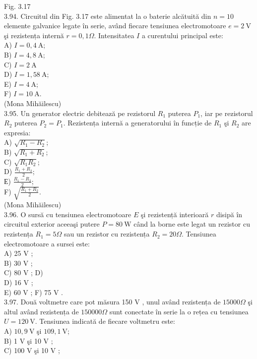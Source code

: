 \documentclass[10pt]{article}
\begin{document}
Fig. 3.17\\
3.94. Circuitul din Fig. 3.17 este alimentat la o baterie alcătuită din $n=10$ elemente galvanice legate în serie, având fiecare tensiunea electromotoare $e=2 \mathrm{~V}$ şi rezistența internă $r=0,1 \Omega$. Intensitatea $I$ a curentului principal este:\\
A) $I=0,4 \mathrm{~A}$;\\
B) $I=4,8 \mathrm{~A}$;\\
C) $I=2 \mathrm{~A}$\\
D) $I=1,58 \mathrm{~A}$;\\
E) $I=4 \mathrm{~A}$;\\
F) $I=10 \mathrm{~A}$.\\
(Mona Mihăilescu)\\
3.95. Un generator electric debitează pe rezistorul $R_{1}$ puterea $P_{1}$, iar pe rezistorul $R_{2}$ puterea $P_{2}=P_{1}$. Rezistența internă a generatorului în funcție de $R_{1}$ şi $R_{2}$ are expresia:\\
A) $\sqrt{R_{1}-R_{2}}$;\\
B) $\sqrt{R_{1}+R_{2}}$;\\
C) $\sqrt{R_{1} R_{2}}$;\\
D) $\frac{R_{1}+R_{2}}{2}$;\\
Е) $\frac{R_{1}-R_{2}}{2}$;\\
F) $\sqrt{\frac{R_{1}+R_{2}}{2}}$.\\
(Mona Mihăilescu)\\
3.96. O sursă cu tensiunea electromotoare $E$ şi rezistență interioară $r$ disipă în circuitul exterior aceeaşi putere $P=80 \mathrm{~W}$ când la borne este legat un rezistor cu rezistența $R_{1}=5 \Omega$ sau un rezistor cu rezistența $R_{2}=20 \Omega$. Tensiunea electromotoare a sursei este:\\
A) 25 V ;\\
B) 30 V ;\\
C) 80 V ; D)\\
D) 16 V ;\\
E) 60 V ; F) 75 V .\\
3.97. Două voltmetre care pot măsura 150 V , unul având rezistența de $15000 \Omega$ şi altul având rezistența de $150000 \Omega$ sunt conectate în serie la o rețea cu tensiunea $U=120 \mathrm{~V}$. Tensiunea indicată de fiecare voltmetru este:\\
A) $10,9 \mathrm{~V}$ şi $109,1 \mathrm{~V}$;\\
B) 1 V şi 10 V ;\\
C) 100 V şi 10 V ;\\
\end{document}
